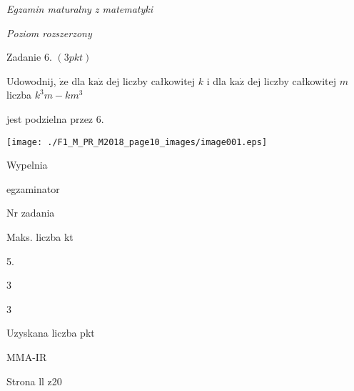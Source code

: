 \documentclass[a4paper,12pt]{article}
\begin{document}
{\it Egzamin maturalny z matematyki}

{\it Poziom rozszerzony}

Zadanie 6. $(3pkt)$

Udowodnij, $\dot{\mathrm{z}}\mathrm{e}$ dla $\mathrm{k}\mathrm{a}\dot{\mathrm{z}}$ dej liczby całkowitej $k$ i dla $\mathrm{k}\mathrm{a}\dot{\mathrm{z}}$ dej liczby całkowitej $m$ liczba $k^{3}m-km^{3}$

jest podzielna przez 6.
\begin{center}
\texttt{[image: ./F1\_M\_PR\_M2018\_page10\_images/image001.eps]}
\end{center}
Wypelnia

egzaminator

Nr zadania

Maks. liczba kt

5.

3

3

Uzyskana liczba pkt

MMA-IR

Strona ll z20
\end{document}
